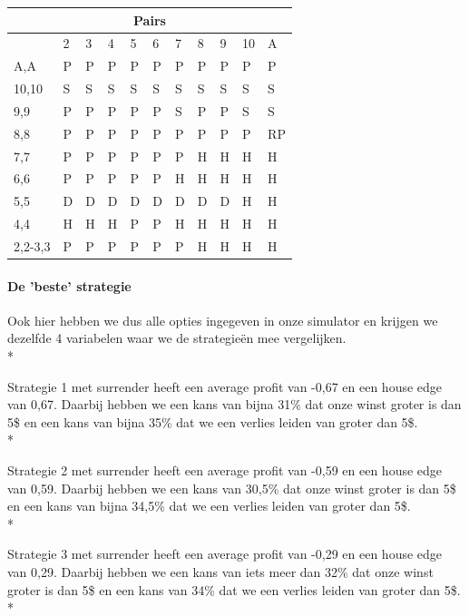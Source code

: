 \documentclass[conference]{IEEEtran}
\begin{document}
\begin{table}[ht]
\begin{tabular}{|l|l|l|l|l|l|l|l|l|l|l|}
\multicolumn{11}{|c|}{\textbf{Pairs}}                                 \\ \hline
                             & 2 & 3 & 4 & 5 & 6 & 7 & 8 & 9 & 10 & A \\ \hline
A,A                          & P & P & P & P & P & P & P & P & P & P  \\ \hline
10,10                        & S & S & S & S & S & S & S & S & S & S  \\ \hline
9,9                          & P & P & P & P & P & S & P & P & S & S  \\ \hline
8,8                          & P & P & P & P & P & P & P & P & P & RP  \\ \hline
7,7                          & P & P & P & P & P & P & H & H & H & H  \\ \hline
6,6                          & P & P & P & P & P & H & H & H & H & H  \\ \hline
5,5                          & D & D & D & D & D & D & D & D & H & H  \\ \hline
4,4                          & H & H & H & P & P & H & H & H & H & H  \\ \hline
2,2-3,3                      & P & P & P & P & P & P & H & H & H & H  \\ \hline
\end{tabular}
\end{table}


\paragraph{De 'beste' strategie}

Ook hier hebben we dus alle opties ingegeven in onze simulator en krijgen we dezelfde 4 variabelen waar we de strategie\"en mee vergelijken. \\*
 
Strategie 1 met surrender heeft een average profit van -0,67 en een house edge van 0,67. Daarbij hebben we een kans van bijna 31\% dat onze winst groter is dan 5\$ en een kans van bijna 35\% dat we een verlies leiden van groter dan 5\$. \\*
 
Strategie 2 met surrender heeft een average profit van -0,59 en een house edge van 0,59. Daarbij hebben we een kans van 30,5\% dat onze winst groter is dan 5\$ en een kans van bijna 34,5\% dat we een verlies leiden van groter dan 5\$. \\*
 
Strategie 3 met surrender heeft een average profit van -0,29 en een house edge van 0,29. Daarbij hebben we een kans van iets meer dan 32\% dat onze winst groter is dan 5\$ en een kans van 34\% dat we een verlies leiden van groter dan 5\$. \\*
 
\end{document}
